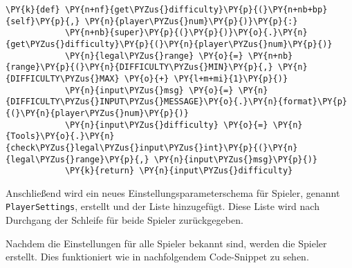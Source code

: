 \begin{Verbatim}[commandchars=\\\{\}]
        \PY{k}{def} \PY{n+nf}{get\PYZus{}difficulty}\PY{p}{(}\PY{n+nb+bp}{self}\PY{p}{,} \PY{n}{player\PYZus{}num}\PY{p}{)}\PY{p}{:}
            \PY{n+nb}{super}\PY{p}{(}\PY{p}{)}\PY{o}{.}\PY{n}{get\PYZus{}difficulty}\PY{p}{(}\PY{n}{player\PYZus{}num}\PY{p}{)}
            \PY{n}{legal\PYZus{}range} \PY{o}{=} \PY{n+nb}{range}\PY{p}{(}\PY{n}{DIFFICULTY\PYZus{}MIN}\PY{p}{,} \PY{n}{DIFFICULTY\PYZus{}MAX} \PY{o}{+} \PY{l+m+mi}{1}\PY{p}{)}
            \PY{n}{input\PYZus{}msg} \PY{o}{=} \PY{n}{DIFFICULTY\PYZus{}INPUT\PYZus{}MESSAGE}\PY{o}{.}\PY{n}{format}\PY{p}{(}\PY{n}{player\PYZus{}num}\PY{p}{)}
            \PY{n}{input\PYZus{}difficulty} \PY{o}{=} \PY{n}{Tools}\PY{o}{.}\PY{n}{check\PYZus{}legal\PYZus{}input\PYZus{}int}\PY{p}{(}\PY{n}{legal\PYZus{}range}\PY{p}{,} \PY{n}{input\PYZus{}msg}\PY{p}{)}
            \PY{k}{return} \PY{n}{input\PYZus{}difficulty}
\end{Verbatim}

    Anschließend wird ein neues Einstellungsparameterschema für Spieler,
genannt \texttt{PlayerSettings}, erstellt und der Liste hinzugefügt.
Diese Liste wird nach Durchgang der Schleife für beide Spieler zurückgegeben.

Nachdem die Einstellungen für alle Spieler bekannt sind, werden die
Spieler erstellt. Dies funktioniert wie in nachfolgendem Code-Snippet zu
sehen.

